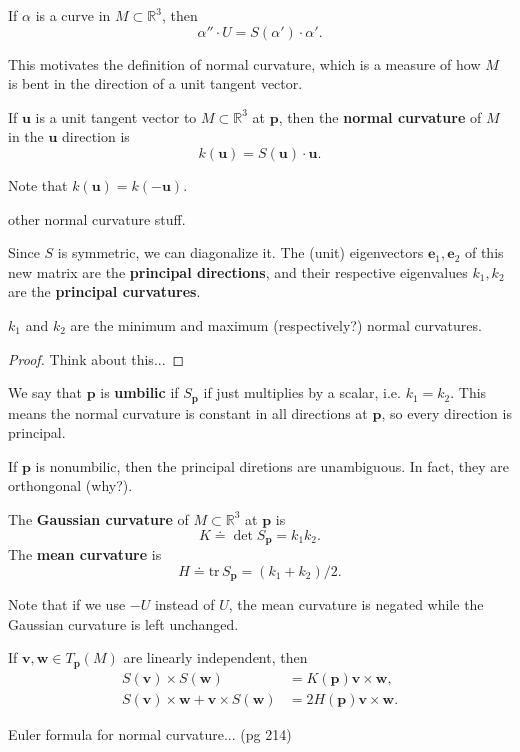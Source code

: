 \documentclass[twoside,10pt]{report}
\begin{document}
\begin{prop}
If $\alpha$ is a curve in $M \subset \mathbb{R}^3$, then
\[
	\alpha'' \cdot U = S(\alpha') \cdot \alpha'.
\] 
\end{prop}

This motivates the definition of normal curvature, which is a measure of how $M$ is bent in the direction of a unit tangent vector.
\begin{defn}[]
If $\mathbf{u}$ is a unit tangent vector to $M \subset \mathbb{R}^3$ at $\mathbf{p}$, then the \textbf{normal curvature} of $M$ in the $\mathbf{u}$ direction is
\[
	k(\mathbf{u}) = S(\mathbf{u}) \cdot \mathbf{u}.
\] 
\end{defn}

Note that $k(\mathbf{u}) = k(-\mathbf{u})$.

{\color{red}other normal curvature stuff.}

Since $S$ is symmetric, we can diagonalize it. The (unit) eigenvectors $\mathbf{e}_1, \mathbf{e}_2$ of this new matrix are the \textbf{principal directions}, and their respective eigenvalues $k_1,k_2$ are the \textbf{principal curvatures}.

\begin{prop}
	$k_1$ and $k_2$ are the minimum and maximum {\color{red}(respectively?)} normal curvatures.
\end{prop}
\begin{proof}
	{\color{red}Think about this...}
\end{proof}

We say that $\mathbf{p}$ is \textbf{umbilic} if $S_{\mathbf{p}}$ if just multiplies by a scalar, i.e. $k_1=k_2$. This means the normal curvature is constant in all directions at $\mathbf{p}$, so every direction is principal.

If $\mathbf{p}$ is nonumbilic, then the principal diretions are unambiguous. In fact, they are orthongonal {\color{red}(why?)}.

\begin{defn}[]
The \textbf{Gaussian curvature} of $M \subset \mathbb{R}^3$ at $\mathbf{p}$ is
\[
K \doteq \det S_{\mathbf{p}} = k_1 k_2.
\] The \textbf{mean curvature} is
\[
	H \doteq \text{tr}\, S_{\mathbf{p}} = (k_1+k_2)/2.
\] 
\end{defn}

Note that if we use $-U$ instead of $U$, the mean curvature is negated while the Gaussian curvature is left unchanged.

\begin{prop}
	If $\mathbf{v},\mathbf{w} \in T_{\mathbf{p}}(M)$ are linearly independent, then
	\begin{align*}
		S(\mathbf{v}) \times S(\mathbf{w}) &= K(\mathbf{p}) \mathbf{v} \times \mathbf{w}, \\
		S(\mathbf{v}) \times \mathbf{w} + \mathbf{v} \times S(\mathbf{w}) &= 2H(\mathbf{p}) \mathbf{v} \times \mathbf{w}.
	\end{align*}
\end{prop}

{\color{red}Euler formula for normal curvature... (pg 214)}
\end{document}
